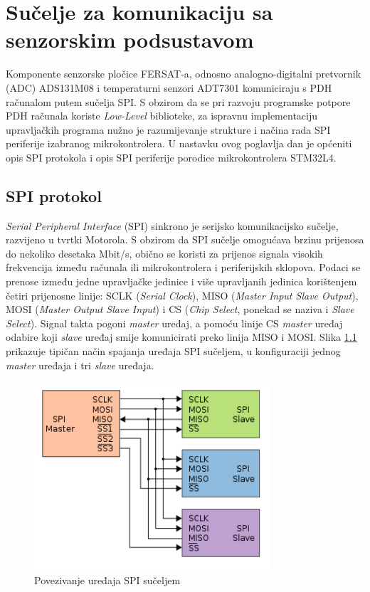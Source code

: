 \chapter{Sučelje za komunikaciju sa senzorskim podsustavom}
	Komponente senzorske pločice FERSAT-a, odnosno analogno-digitalni pretvornik (ADC) ADS131M08 i temperaturni senzori ADT7301 komuniciraju s PDH računalom putem sučelja SPI. S obzirom da se pri razvoju programske potpore PDH računala koriste \textit{Low-Level} biblioteke, za ispravnu implementaciju upravljačkih programa nužno je razumijevanje strukture i načina rada SPI periferije izabranog mikrokontrolera. U nastavku ovog poglavlja dan je općeniti opis SPI protokola i opis SPI periferije porodice mikrokontrolera STM32L4.
	
	\section{SPI protokol}
		\textit{Serial Peripheral Interface} (SPI) sinkrono je serijsko komunikacijsko sučelje, razvijeno u tvrtki Motorola. S obzirom da SPI sučelje omogućava brzinu prijenosa do nekoliko desetaka Mbit/s, obično se koristi za prijenos signala visokih frekvencija između računala ili mikrokontrolera i periferijskih sklopova. Podaci se prenose između jedne upravljačke jedinice  i više upravljanih jedinica  korištenjem četiri prijenosne linije: SCLK (\textit{Serial Clock}), MISO (\textit{Master Input Slave Output}), MOSI (\textit{Master Output Slave Input}) i CS (\textit{Chip Select}, ponekad se naziva i \textit{Slave Select}). Signal takta pogoni \textit{master} uređaj, a pomoću linije CS \textit{master} uređaj odabire koji \textit{slave} uređaj smije komunicirati preko linija MISO i MOSI. Slika \ref{fig:spi} prikazuje tipičan način spajanja uređaja SPI sučeljem, u konfiguraciji jednog \textit{master} uređaja i tri \textit{slave} uređaja.
		
		\begin{figure}[htb]
			\centering
			\includegraphics[height=7cm]{slike/spi.png}
			\caption{Povezivanje uređaja SPI sučeljem \cite{spi_wikipedia}}
			\label{fig:spi}
		\end{figure}
	
